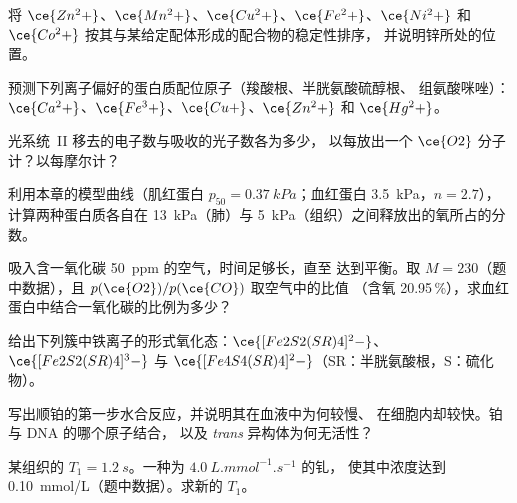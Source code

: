 \begin{exercise}[$\star$]\label{exo:b3:bioinorganic:2}
将 $\ce{Zn^2+}$、$\ce{Mn^2+}$、$\ce{Cu^2+}$、$\ce{Fe^2+}$、$\ce{Ni^2+}$ 和 $\ce{Co^2+}$ 按其与某给定配体形成的配合物的稳定性排序，
并说明锌所处的位置。
\end{exercise}

\begin{exercise}[$\star$]\label{exo:b3:bioinorganic:3}
预测下列离子偏好的蛋白质配位原子（羧酸根、半胱氨酸硫醇根、
组氨酸咪唑）：$\ce{Ca^2+}$、$\ce{Fe^3+}$、$\ce{Cu+}$、$\ce{Zn^2+}$ 和 $\ce{Hg^2+}$。
\end{exercise}

\begin{exercise}[$\star$]\label{exo:b3:bioinorganic:4}
光系统~II 移去的电子数与吸收的光子数各为多少，
以每放出一个 $\ce{O2}$ 分子计？以每摩尔计？
\end{exercise}

\begin{exercise}[$\star\star$]\label{exo:b3:bioinorganic:5}
利用本章的模型曲线（肌红蛋白 $p_{50} = \qty{0.37}{kPa}$；血红蛋白 \qty{3.5}{kPa}，$n = 2.7$），
计算两种蛋白质各自在
\qty{13}{kPa}（肺）与 \qty{5}{kPa}（组织）之间释放出的氧所占的分数。
\end{exercise}

\begin{exercise}[$\star\star$]\label{exo:b3:bioinorganic:6}
吸入含一氧化碳 \qty{50}{ppm} 的空气，时间足够长，直至
达到平衡。取 $M = 230$（题中数据），且 $p(\ce{O2})/p(\ce{CO})$ 取空气中的比值
（含氧 20.95\,\%），求血红蛋白中结合一氧化碳的比例为多少？
\end{exercise}

\begin{exercise}[$\star\star$]\label{exo:b3:bioinorganic:7}
给出下列簇中铁离子的形式氧化态：$\ce{[Fe2S2(SR)4]^2-}$、
$\ce{[Fe2S2(SR)4]^3-}$ 与 $\ce{[Fe4S4(SR)4]^2-}$（SR：半胱氨酸根，S：硫化物）。
\end{exercise}

\begin{exercise}[$\star\star$]\label{exo:b3:bioinorganic:8}
写出顺铂的第一步水合反应，并说明其在血液中为何较慢、
在细胞内却较快。铂与 DNA 的哪个原子结合，
以及 \textit{trans} 异构体为何无活性？
\end{exercise}

\begin{exercise}[$\star\star$]\label{exo:b3:bioinorganic:9}
某组织的 $T_1 = \qty{1.2}{s}$。一种为 $\qty{4.0}{L.mmol^{-1}.s^{-1}}$ 的钆，
使其中浓度达到 \qty{0.10}{mmol/L}（题中数据）。求新的 $T_1$。
\end{exercise}

